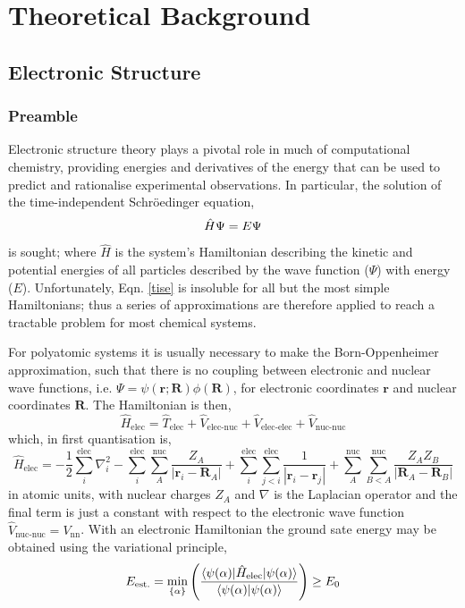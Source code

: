 \documentclass[main.tex]{subfiles}
\begin{document}
\setcounter{footnote}{0} 

\chapter{Theoretical Background}

\section{Electronic Structure}
\subsection{Preamble}
Electronic structure theory plays a pivotal role in much of computational chemistry, providing energies and derivatives of the energy that can be used to predict and rationalise experimental observations. In particular, the solution of the time-independent Schr\"{o}edinger equation,
\begin{equation}
\hat{H} \Psi  = E \Psi
\label{tise}
\vspace{-0.3cm}
\end{equation}
is sought; where $\hat{H}$ is the system's Hamiltonian describing the kinetic and potential energies of all particles described by the wave function ($\Psi$) with  energy ($E$). Unfortunately, Eqn. \eqref{tise} is insoluble for all but the most simple Hamiltonians; thus a series of approximations are therefore applied to reach a tractable problem for most chemical systems.

For polyatomic systems it is usually necessary to make the Born-Oppenheimer approximation, such that there is no coupling between electronic and nuclear wave functions, i.e. $\Psi = \psi(\boldsymbol{r}; \boldsymbol{R})\phi(\boldsymbol{R})$, for electronic coordinates $\boldsymbol{r}$ and nuclear coordinates $\boldsymbol{R}$. The Hamiltonian is then,
\begin{equation}
\hat{H}_\text{elec} = \hat{T}_\text{elec} + \hat{V}_\text{elec-nuc} + \hat{V}_\text{elec-elec} +  \hat{V}_\text{nuc-nuc}
\end{equation}
which, in first quantisation is,
\begin{equation}
\hat{H}_\text{elec} = -\frac{1}{2}\sum_{i}^\text{elec} \nabla^2_i  - \sum_{i}^\text{elec}\sum_A^\text{nuc}\frac{Z_A}{|\boldsymbol{r}_i - \boldsymbol{R}_A|} +  \sum_{i}^\text{elec}\sum_{j < i}^\text{elec} \frac{1}{|\boldsymbol{r}_i - \boldsymbol{r}_j|} + \sum_{A}^\text{nuc}\sum_{B < A}^\text{nuc} \frac{Z_A Z_B}{|\boldsymbol{R}_A - \boldsymbol{R}_B|}
\label{H_elec}
\end{equation}
 in atomic units, with nuclear charges $Z_A$ and $\nabla$ is the Laplacian operator and the final term is just a constant with respect to the electronic wave function $\hat{V}_\text{nuc-nuc} = V_\text{nn}$. With an electronic Hamiltonian the ground sate energy may be obtained using the variational principle,
 \begin{equation}
 	E_\text{est.} = \min_{\{\alpha\}}\left(\frac{\braket{\psi(\alpha) | \hat{H}_\text{elec}| \psi(\alpha)}}{\braket{\psi(\alpha)| \psi(\alpha)}}\right) \ge E_0
 \end{equation}
 
\end{document}
